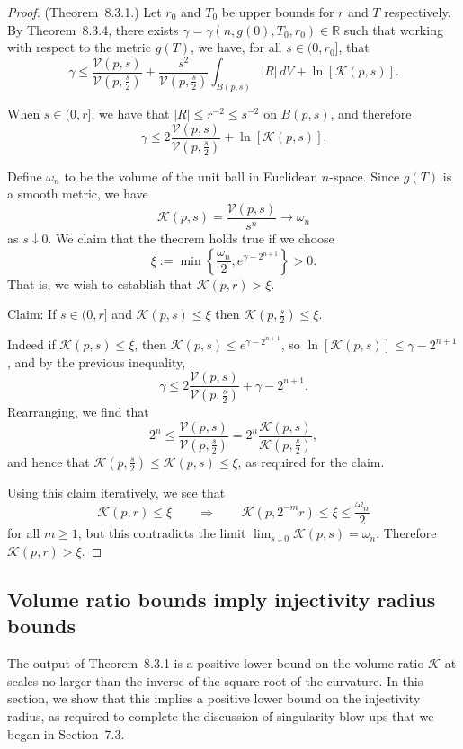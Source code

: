 \begin{proof}
(Theorem~8.3.1.) Let $r_0$ and $T_0$ be upper bounds for $r$ and $T$
respectively. By Theorem~8.3.4, there exists $\gamma=\gamma(n,g(0),T_0,r_0)\in\mathbb R$ such that
working with respect to the metric $g(T)$, we have, for all $s\in(0,r_0]$,
that
\[
\gamma \le \frac{\mathcal V(p,s)}{\mathcal V(p,\frac{s}{2})}
+\frac{s^2}{\mathcal V(p,\frac{s}{2})}\int_{B(p,s)} |R|\,dV + \ln[\mathcal K(p,s)].
\]

When $s \in (0,r]$, we have that $|R| \le r^{-2} \le s^{-2}$ on $B(p,s)$, and
therefore
\[
\gamma \le 2 \frac{\mathcal V(p,s)}{\mathcal V(p,\frac{s}{2})} + \ln [\mathcal K(p,s)].
\]

Define $\omega_n$ to be the volume of the unit ball in Euclidean $n$-space.
Since $g(T)$ is a smooth metric, we have
\[
\mathcal K(p,s) = \frac{\mathcal V(p,s)}{s^n} \to \omega_n
\]
as $s \downarrow 0$. We claim that the theorem holds true if we choose
\[
\xi := \min\left\{ \frac{\omega_n}{2}, e^{\gamma - 2^{n+1}} \right\} > 0.
\]
That is, we wish to establish that $\mathcal K(p,r) > \xi$.

Claim: If $s \in (0,r]$ and $\mathcal K(p,s) \le \xi$ then $\mathcal K(p,\frac{s}{2}) \le \xi$.

Indeed if $\mathcal K(p,s) \le \xi$, then $\mathcal K(p,s) \le e^{\gamma - 2^{n+1}}$, so
$\ln[\mathcal K(p,s)] \le \gamma - 2^{n+1}$, and by the previous inequality,
\[
\gamma \le 2 \frac{\mathcal V(p,s)}{\mathcal V(p,\frac{s}{2})} + \gamma - 2^{n+1}.
\]
Rearranging, we find that
\[
2^n \le \frac{\mathcal V(p,s)}{\mathcal V(p,\frac{s}{2})} = 2^n \frac{\mathcal K(p,s)}{\mathcal K(p,\frac{s}{2})},
\]
and hence that $\mathcal K(p,\frac{s}{2}) \le \mathcal K(p,s) \le \xi$, as
required for the claim.

Using this claim iteratively, we see that
\[
\mathcal K(p,r) \le \xi \qquad \Longrightarrow \qquad \mathcal K(p,2^{-m}r) \le \xi \le \frac{\omega_n}{2}
\]
for all $m \ge 1$, but this contradicts the limit
$\lim_{s\downarrow 0}\mathcal K(p,s)=\omega_n$. Therefore $\mathcal K(p,r)>\xi$.
\end{proof}

\subsection{Volume ratio bounds imply injectivity radius bounds}

The output of Theorem~8.3.1 is a positive lower bound on the volume ratio
$\mathcal K$ at scales no larger than the inverse of the square-root of the
curvature. In this section, we show that this implies a positive lower bound
on the injectivity radius, as required to complete the discussion of
singularity blow-ups that we began in Section~7.3.

